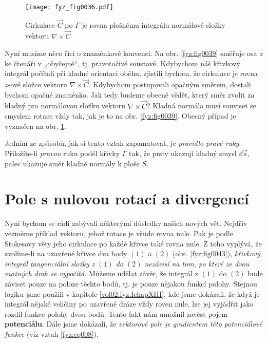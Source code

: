     \begin{figure}[ht!]  %
      \centering
      \texttt{[image: fyz\_fig0036.pdf]}
      \caption{Cirkulace \(\vec{C}\) po \(\Gamma\) je rovna plošnému integrálu normálové složky
        vektoru \(\nabla\times\vec{C}\)}
      \label{fyz:fig0036}   
    \end{figure} 
    Nyní musíme něco říci o znaménkové konvenci. Na obr. \ref{fyz:fig0039} směřuje osa 
    \(z\) ke čtenáři v „obyčejné“, tj. pravotočivé soustavě. Kdybychom náš křivkový integrál 
    počítali při kladné orientaci oběhu, zjistili bychom, že cirkulace je rovna \(z\)-ové složce 
    vektoru \(\nabla\times\vec{C}\). Kdybychom postupovali opačným směrem, dostali bychom opačné 
    znaménko. Jak tedy budeme obecně vědět, který směr zvolit za kladný pro normálovou složku 
    vektoru \(\nabla\times\vec{C}\)? Kladná normála musí souviset se smyslem rotace vždy tak, jak 
    je to na obr. \ref{fyz:fig0039}. Obecný případ je vyznačen na obr. \ref{fyz:fig0036}.

    Jedním ze způsobů, jak si tento vztah zapamatovat, je \emph{pravidlo pravé ruky}. Přiložíte-li
    \emph{pravou} ruku podél křivky \(\Gamma\) tak, že prsty ukazují kladný smysl \(\dd{\vec{s}}\), 
    palec ukazuje směr kladné normály k ploše \(S\).


  \section{Pole s nulovou rotací a divergencí}\label{fyz:IIchapIIIsecVI}
    Nyní bychom se rádi zabývali některými důsledky našich nových vět. Nejdřív vezměme příklad 
    vektoru, jehož rotace je všude rovna nule. Pak je podle Stokesovy věty jeho cirkulace po každé 
    křivce také rovna nule. Z toho vyplývá, že zvolíme-li na uzavřené křivce dva body \((1)\) a 
    \((2)\) (obr. \ref{fyz:fig0043}), \emph{křivkový integrál tangenciální složky z \((1)\) do 
    \((2)\) nezávisí na tom, po které ze dvou možných drah se vypočítá.} Můžeme udělat závěr, že 
    integrál z \((1)\) do \((2)\) bude záviset pouze na poloze těchto bodů, tj. je pouze nějakou 
    funkcí polohy. Stejnou logiku jsme použili v kapitole \ref{vol02:fyz:IchapXIII}, kde jsme 
    dokázali, že když je integrál nějaké veličiny po uzavřené dráze vždy roven nule, lze jej 
    vyjádřit jako rozdíl funkce polohy dvou bodů. Tento fakt nám umožnil zavést pojem 
    \textbf{potenciálu}. Dále jsme dokázali, že \emph{vektorové pole je gradientem této 
    potenciálové funkce} (viz vztah \ref{fyz:eq008}).

